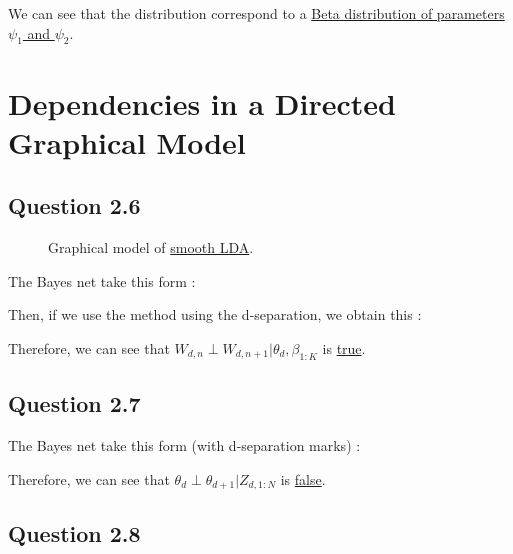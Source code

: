 \documentclass{article}
\begin{document}
We can see that the distribution correspond to a \underline{Beta distribution of parameters $\psi_1$ and $\psi_2$}.

\section{Dependencies in a Directed Graphical Model}

\subsection{Question 2.6}

\begin{figure}[H]
    \centering
    
    \caption{Graphical model of \href{https://www.jmlr.org/papers/volume3/blei03a/blei03a.pdf}{smooth LDA}.}
    \label{fig:fig1}
\end{figure}

The Bayes net take this form :

\begin{figure}[H]
    \centering
    
    \label{fig:fig1.2.6.1}
\end{figure}

Then, if we use the method using the d-separation, we obtain this :

\begin{figure}[H]
    \centering
    
    \label{fig:fig1.2.6.2}
\end{figure}

Therefore, we can see that $W_{d,n} \perp W_{d,n+1} | \theta_d, \beta_{1:K}$ is \underline{true}.

\subsection{Question 2.7}

The Bayes net take this form (with d-separation marks) :
\begin{figure}[H]
    \centering
    
    \label{fig:fig1.2.7}
\end{figure}

Therefore, we can see that $\theta_{d} \perp \theta_{d+1} | Z_{d,1:N}$ is \underline{false}.

\subsection{Question 2.8}
\end{document}
